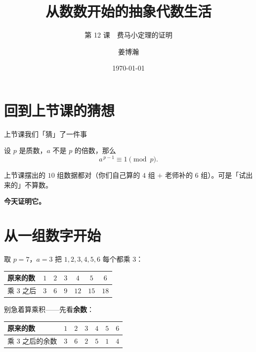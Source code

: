 \documentclass[10pt]{beamer}
\title{从数数开始的抽象代数生活}
\subtitle{第 12 课　费马小定理的证明}
\author{姜博瀚}
\institute{厦门大学附属实验中学}
\date{\today}
\begin{document}
\begin{frame}
  \titlepage
\end{frame}

\section{回到上节课的猜想}

\begin{frame}{上节课我们「猜」了一件事}
  \begin{theorem}[猜想]
    设 \(p\) 是质数，\(a\) 不是 \(p\) 的倍数，那么
    \[
      a^{\,p-1}\equiv1 \pmod p .
    \]
  \end{theorem}
  \pause
  \begin{center}
    {\large 上节课摆出的 \(10\) 组数据都对（你们自己算的 \(4\) 组 \(+\) 老师补的 \(6\) 组）。\pause 可是「试出来的」不算数。}
  \end{center}
  \pause
  \begin{center}
    {\Large\textcolor{textgreen}{\bfseries 今天证明它。}}
  \end{center}
\end{frame}

\section{从一组数字开始}

\begin{frame}{取 \(p=7\)，\(a=3\)}
  把 \(1,2,3,4,5,6\) 每个都乘 \(3\)：
  \begin{center}
  \begin{tabular}{@{}lcccccc@{}}
    \toprule
    原来的数 & \(1\) & \(2\) & \(3\) & \(4\) & \(5\) & \(6\) \\
    \midrule
    乘 \(3\) 之后 & \(3\) & \(6\) & \(9\) & \(12\) & \(15\) & \(18\) \\
    \bottomrule
  \end{tabular}
  \end{center}
  \pause
  别急着算乘积——先看\textbf{余数}：
  \begin{center}
  \begin{tabular}{@{}lcccccc@{}}
    \toprule
    原来的数 & \(1\) & \(2\) & \(3\) & \(4\) & \(5\) & \(6\) \\
    \midrule
    乘 \(3\) 之后的余数 & \(3\) & \(6\) & \(2\) & \(5\) & \(1\) & \(4\) \\
    \bottomrule
  \end{tabular}
  \end{center}
\end{frame}
\end{document}
